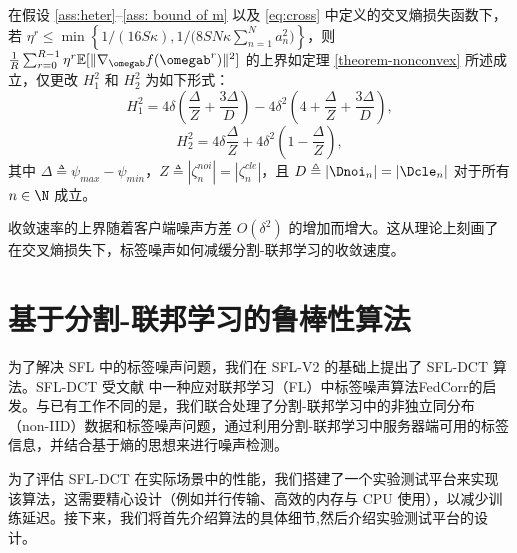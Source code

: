 \begin{theorem}[交叉熵损失下的收敛性]\label{thm:cross-entropy}
在假设 \ref{ass:heter}--\ref{ass: bound of m} 以及 \eqref{eq:cross} 中定义的交叉熵损失函数下，若 $\eta^r \leq \min\left\{ {1}/{(16S\kappa)},  {1}/{(8SN\kappa\sum_{n=1}^Na_n^2})\right\}$，则 $\frac{1}{R}\sum_{r=0}^{R-1}\eta^r\mathbb{E}[\Vert\nabla_{\omegab}f(\omegab^{r})\Vert^2]$ 的上界如定理 \ref{theorem-nonconvex} 所述成立，仅更改 $H_1^2$ 和 $H^2_2$ 为如下形式：
\begin{equation}\label{eq:H}
    H_1^2=4\delta\left(\frac{\Delta}{Z}+\frac{3\Delta}{D}\right)
    -4\delta^2\left(4+\frac{\Delta}{Z}+\frac{3\Delta}{D}\right),
\end{equation}
\begin{equation}\label{eq:H}
    H_2^2 =4\delta\frac{\Delta}{Z}+4\delta^2\left(1-\frac{\Delta}{Z}\right),
\end{equation}
其中 $\Delta \triangleq \psi_{max}-\psi_{min}$，$Z \triangleq |\zeta_n^{noi}| = |\zeta_n^{cle}|$，且 $D\triangleq |\Dnoi_n|=|\Dcle_n|$ 对于所有 $n\in\N$ 成立。
\end{theorem}

收敛速率的上界随着客户端噪声方差 $O(\delta^2)$ 的增加而增大。这从理论上刻画了在交叉熵损失下，标签噪声如何减缓分割-联邦学习的收敛速度。


\section{基于分割-联邦学习的鲁棒性算法}
为了解决 SFL 中的标签噪声问题，我们在 SFL-V2 的基础上提出了 SFL-DCT 算法。SFL-DCT 受文献 \cite{b9} 中一种应对联邦学习（FL）中标签噪声算法FedCorr的启发。与已有工作不同的是，我们联合处理了分割-联邦学习中的非独立同分布（non-IID）数据和标签噪声问题，通过利用分割-联邦学习中服务器端可用的标签信息，并结合基于熵的思想来进行噪声检测。

为了评估 SFL-DCT 在实际场景中的性能，我们搭建了一个实验测试平台来实现该算法，这需要精心设计（例如并行传输、高效的内存与 CPU 使用），以减少训练延迟。接下来，我们将首先介绍算法的具体细节,然后介绍实验测试平台的设计。
